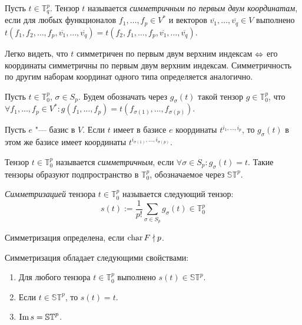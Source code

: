 \begin{definition}
	Пусть $t \in \mathbb{T}^p_q$. Тензор $t$ называется \textit{симметричным по первым двум координатам}, если для любых функционалов $f_1, \dots, f_p \in V^*$ и векторов $\overline{v_1}, \dots, \overline{v_q} \in V$ выполнено $t(f_1, f_2, \dots, f_p, \overline{v_1}, \dots, \overline{v_q}) = t(f_2, f_1, \dots, f_p, \overline{v_1}, \dots, \overline{v_q})$.
\end{definition}

\begin{note}
	Легко видеть, что $t$ симметричен по первым двум верхним индексам $\Leftrightarrow$ его координаты симметричны по первым двум верхним индексам. Симметричность по другим наборам координат одного типа определяется аналогично.
\end{note}

\begin{definition}
	Пусть $t \in \mathbb{T}^p_0$, $\sigma \in S_p$. Будем обозначать через $g_\sigma(t)$ такой тензор $g \in \mathbb{T}^p_0$, что $\forall f_1, \dotsc, f_p \in V^*: g(f_1, \dots, f_p) = t(f_{\sigma(1)}, \dots, f_{\sigma(p)})$.
\end{definition}

\begin{note}
	Пусть $e$ "--- базис в $V$. Если $t$ имеет в базисе $e$ координаты $t^{i_1, \dots, i_p}$, то $g_\sigma(t)$ в этом же базисе имеет координаты $t^{i_{\sigma(1)}, \dots, i_{\sigma(p)}}$.
\end{note}

\begin{definition}
	Тензор $t \in \mathbb{T}^p_0$ называется \textit{симметричным}, если $\forall \sigma \in S_p: g_\sigma(t) = t$. Такие тензоры образуют подпространство в $\mathbb{T}^p_0$, обозначаемое через $\mathbb{ST}^p$.
\end{definition}

\begin{definition}
	\textit{Симметризацией} тензора $t \in \mathbb{T}^p_0$ называется следующий тензор:
	\[s(t) := \frac1{p!}\sum_{\sigma \in S_p}g_\sigma(t) \in \mathbb{T}^p_0\]
	
	Симметризация определена, если $\operatorname{char}{F} \nmid p$.
\end{definition}

\begin{proposition} Симметризация обладает следующими свойствами:
	\begin{enumerate}
		\item Для любого тензора $t \in \mathbb{T}^p_0$ выполнено $s(t) \in \mathbb{ST}^p$.
		\item Если $t \in \mathbb{ST}^p$, то $s(t) = t$.
		\item $\operatorname{Im}{s} = \mathbb{ST}^p$.
	\end{enumerate}
\end{proposition}

